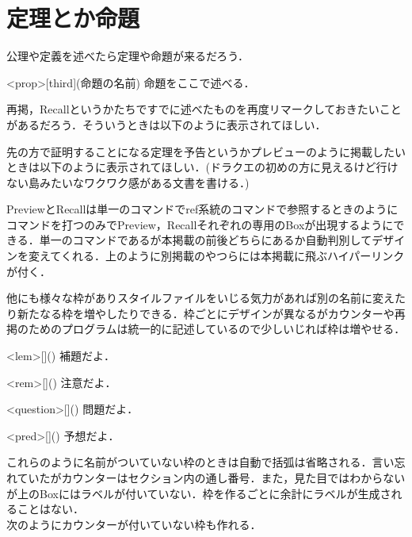 \documentclass[11pt, a4paper]{ltjsarticle}
\begin{document}
\section{定理とか命題}
公理や定義を述べたら定理や命題が来るだろう．
\begin{statementsp}<prop>[third](命題の名前)
    命題をここで述べる．
\end{statementsp}



再掲，Recallというかたちですでに述べたものを再度リマークしておきたいことがあるだろう．そういうときは以下のように表示されてほしい．

先の方で証明することになる定理を予告というかプレビューのように掲載したいときは以下のように表示されてほしい．(ドラクエの初めの方に見えるけど行けない島みたいなワクワク感がある文書を書ける．)

PreviewとRecallは単一のコマンドでref系統のコマンドで参照するときのようにコマンドを打つのみでPreview，Recallそれぞれの専用のBoxが出現するようにできる．単一のコマンドであるが本掲載の前後どちらにあるか自動判別してデザインを変えてくれる．上のように別掲載のやつらには本掲載に飛ぶハイパーリンクが付く．

他にも様々な枠がありスタイルファイルをいじる気力があれば別の名前に変えたり新たなる枠を増やしたりできる．枠ごとにデザインが異なるがカウンターや再掲のためのプログラムは統一的に記述しているので少しいじれば枠は増やせる．

\begin{statementsp}<lem>[]()
    補題だよ．
\end{statementsp}

\begin{statementsp}<rem>[]()
    注意だよ．
\end{statementsp}

\begin{statementsp}<question>[]()
    問題だよ．
\end{statementsp}

\begin{statementsp}<pred>[]()
    予想だよ．
\end{statementsp}

これらのように名前がついていない枠のときは自動で括弧は省略される．言い忘れていたがカウンターはセクション内の通し番号．また，見た目ではわからないが上のBoxにはラベルが付いていない．枠を作るごとに余計にラベルが生成されることはない．\\ 
次のようにカウンターが付いていない枠も作れる．
\end{document}
